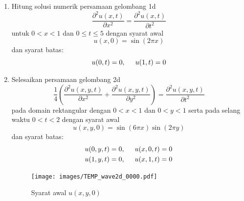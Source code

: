 \documentclass[12pt,bahasa]{article}
\begin{document}
\begin{enumerate}[label=(\alph*)]
%
\item Hitung solusi numerik persamaan gelombang 1d
\begin{equation}
\frac{\partial^2 u(x,t)}{\partial x^2} = \frac{\partial^2 u(x,t)}{\partial t^2}
\end{equation}
untuk $0 < x < 1$ dan $0 \leq t \leq 5$ dengan syarat awal
\begin{equation*}
u(x,0) = \sin\left(2\pi x\right)
\end{equation*}
dan syarat batas:
\begin{equation*}
u(0,t) = 0, \hspace{0.5cm} u(1,t) = 0
\end{equation*}
%
\item Selesaikan persamaan gelombang 2d
\begin{equation}
\frac{1}{4}\left(\frac{\partial^2 u(x,y,t)}{\partial x^2} +
\frac{\partial^2 u(x,y,t)}{\partial y^2}\right)
= \frac{\partial^2 u(x,y,t)}{\partial t^2}
\end{equation}
pada domain rektangular dengan $0 < x < 1$ dan $0 < y < 1$ serta
pada selang waktu $0 < t < 2$ dengan syarat awal
\begin{equation*}
u(x,y,0) = \sin(6\pi x)\sin(2\pi y)
\end{equation*}
dan syarat batas:
\begin{align*}
u(0,y,t) = 0, \hspace{0.5cm} u(x,0,t) = 0 \\
u(1,y,t) = 0, \hspace{0.5cm} u(x,1,t) = 0
\end{align*}

\begin{figure}[H]
\centering
\texttt{[image: images/TEMP\_wave2d\_0000.pdf]}
\par
\caption{Syarat awal $u(x,y,0)$}
\end{figure}
%
\end{enumerate}



%
%
%
%
%
%
%
\end{document}
